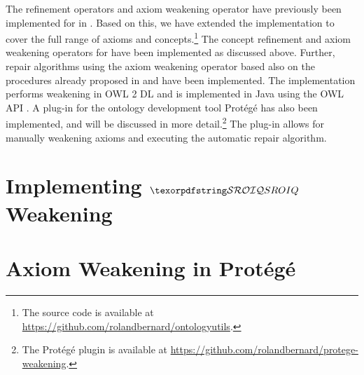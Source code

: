
The refinement operators and axiom weakening operator have previously been implemented for \ALC in \cite{troquard2018repairing}. Based on this, we have extended the implementation to cover the full range of \SROIQ axioms and concepts.\footnote{The source code is available at \url{https://github.com/rolandbernard/ontologyutils}.} The concept refinement and axiom weakening operators for \SROIQ have been implemented as discussed above. Further, repair algorithms using the axiom weakening operator based also on the procedures already proposed in \cite{troquard2018repairing} and \cite{confalonieri2020towards} have been implemented. The implementation performs weakening in OWL 2 DL \cite{motik2012ontology} and is implemented in Java using the OWL API \cite{horridge2011owl,owlapi,matentzoglu2016introduction}. A plug-in for the ontology development tool Protégé has also been implemented, and will be discussed in more detail.\footnote{The Protégé plugin is available at \url{https://github.com/rolandbernard/protege-weakening}.} The plug-in allows for manually weakening axioms and executing the automatic repair algorithm.

\section{Implementing \texorpdfstring{$\SROIQ$}{SROIQ} Weakening}\label{prototype}



\section{Axiom Weakening in Protégé}\label{protege}


